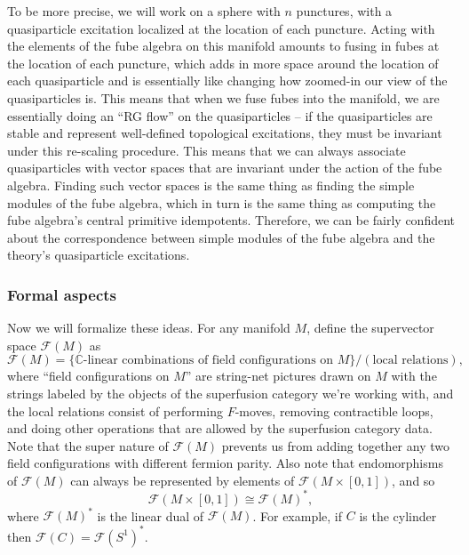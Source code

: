 \documentclass[12pt,a4paper]{article}
\newcommand{\cc}{\mathbb{C}}
\newcommand\be            {\begin{equation}}
\newcommand\ee            {\end{equation}}
\newcommand{\zc}{\mathcal{Z}(\mathcal{C})}
\newcommand{\fld}{\mathcal{F}}
\newcommand{\remove}[1]{{\color{amber(sae/ece)}\footnotesize{(RM?) #1}}}
\begin{document}
To be more precise, we will work on a sphere with $n$ punctures, with a quasiparticle excitation localized at the location of each puncture. Acting with the elements of the fube algebra on this manifold amounts to fusing in fubes at the location of each puncture, which adds in more space around the location of each quasiparticle and is essentially like changing how zoomed-in our view of the quasiparticles is. This means that when we fuse fubes into the manifold, we are essentially doing an ``RG flow'' on the quasiparticles -- if the quasiparticles are stable and represent well-defined topological excitations, they must be invariant under this re-scaling procedure. This means that we can always associate quasiparticles with vector spaces that are invariant under the action of the fube algebra. Finding such vector spaces is the same thing as finding the simple modules of the fube algebra, which in turn is the same thing as computing the fube algebra's central primitive idempotents. Therefore, we can be fairly confident about the correspondence between simple modules of the fube algebra and the theory's quasiparticle excitations. 

\subsubsection{Formal aspects}

Now we will formalize these ideas. For any manifold $M$, define the supervector space $\fld(M)$ as 
\be \fld(M) = \{\text{$\cc$-linear combinations of field configurations on $M$}\} / (\text{local relations}), \ee
where ``field configurations on $M$'' are string-net pictures drawn on $M$ with the strings labeled by the objects of the superfusion category we're working with, and the local relations consist of performing $F$-moves, removing contractible loops, and doing other operations that are allowed by the superfusion category data. Note that the super nature of $\fld(M)$ prevents us from adding together any two field configurations with different fermion parity. Also note that endomorphisms of $\fld(M)$ can always be represented by elements of $\fld(M\times [0,1])$, and so \be \fld(M\times[0,1]) \cong \fld(M)^*,\ee
where $\fld(M)^*$ is the linear dual of $\fld(M)$. For example, if $C$ is the cylinder then $\fld(C) = \fld(S^1)^*$. 
\end{document}
